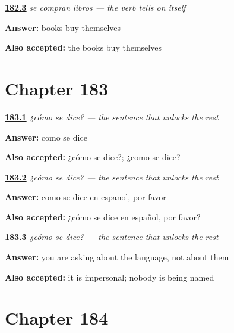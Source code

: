 \noindent\begin{minipage}[t]{\linewidth}
\raggedright
\hyperlink{review-ES-C52-se-venden-origin}{\textbf{182.3}} \emph{se compran libros — the verb tells on itself}\par
\small \textbf{Answer:} books buy themselves\par
\footnotesize \textbf{Also accepted:} the books buy themselves
\end{minipage}\par\medskip

\section*{Chapter 183}

\noindent\begin{minipage}[t]{\linewidth}
\raggedright
\hyperlink{review-ES-C52-como-se-dice-ask}{\textbf{183.1}} \emph{¿cómo se dice? — the sentence that unlocks the rest}\par
\small \textbf{Answer:} como se dice\par
\footnotesize \textbf{Also accepted:} ¿cómo se dice?; ¿como se dice?
\end{minipage}\par\medskip

\noindent\begin{minipage}[t]{\linewidth}
\raggedright
\hyperlink{review-ES-C52-como-se-dice-full}{\textbf{183.2}} \emph{¿cómo se dice? — the sentence that unlocks the rest}\par
\small \textbf{Answer:} como se dice en espanol, por favor\par
\footnotesize \textbf{Also accepted:} ¿cómo se dice en español, por favor?
\end{minipage}\par\medskip

\noindent\begin{minipage}[t]{\linewidth}
\raggedright
\hyperlink{review-ES-C52-como-se-dice-why}{\textbf{183.3}} \emph{¿cómo se dice? — the sentence that unlocks the rest}\par
\small \textbf{Answer:} you are asking about the language, not about them\par
\footnotesize \textbf{Also accepted:} it is impersonal; nobody is being named
\end{minipage}\par\medskip

\section*{Chapter 184}


